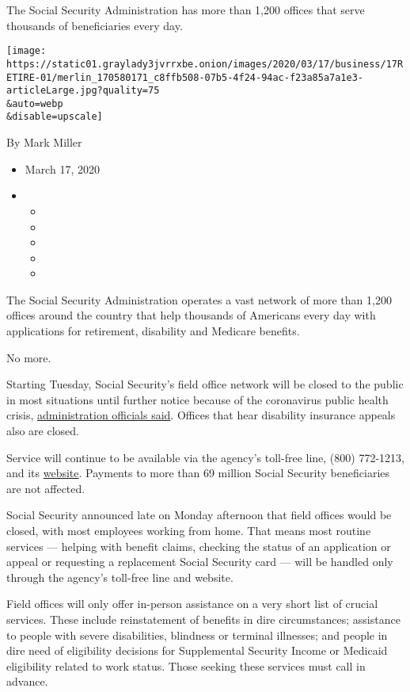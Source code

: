 The Social Security Administration has more than 1,200 offices that
serve thousands of beneficiaries every day.

\texttt{[image: https://static01.graylady3jvrrxbe.onion/images/2020/03/17/business/17RETIRE-01/merlin\_170580171\_c8ffb508-07b5-4f24-94ac-f23a85a7a1e3-articleLarge.jpg?quality=75\\\&auto=webp\\\&disable=upscale]}

By Mark Miller

\begin{itemize}
\item
  March 17, 2020
\item
  \begin{itemize}
  \item
  \item
  \item
  \item
  \item
  \end{itemize}
\end{itemize}

The Social Security Administration operates a vast network of more than
1,200 offices around the country that help thousands of Americans every
day with applications for retirement, disability and Medicare benefits.

No more.

Starting Tuesday, Social Security's field office network will be closed
to the public in most situations until further notice because of the
coronavirus public health crisis,
\href{https://www.ssa.gov/news/press/releases/2020/\#3-2020-2}{administration
officials said}. Offices that hear disability insurance appeals also are
closed.

Service will continue to be available via the agency's toll-free line,
(800) 772-1213, and its
\href{https://www.ssa.gov/onlineservices/}{website}. Payments to more
than 69 million Social Security beneficiaries are not affected.

Social Security announced late on Monday afternoon that field offices
would be closed, with most employees working from home. That means most
routine services --- helping with benefit claims, checking the status of
an application or appeal or requesting a replacement Social Security
card --- will be handled only through the agency's toll-free line and
website.

Field offices will only offer in-person assistance on a very short list
of crucial services. These include reinstatement of benefits in dire
circumstances; assistance to people with severe disabilities, blindness
or terminal illnesses; and people in dire need of eligibility decisions
for Supplemental Security Income or Medicaid eligibility related to work
status. Those seeking these services must call in advance.

